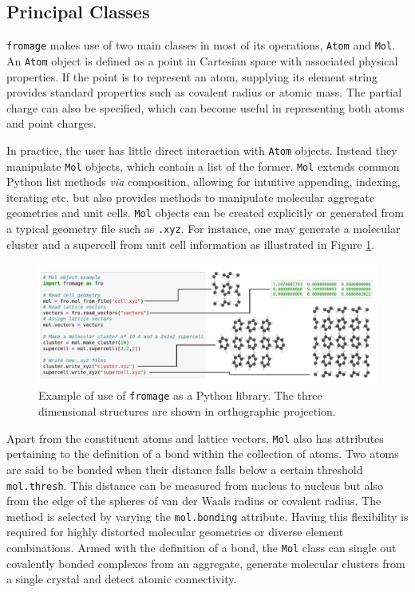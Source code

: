 \subsection{Principal Classes}
\texttt{fromage} makes use of two main classes in most of its operations, \texttt{Atom} and \texttt{Mol}. An \texttt{Atom} object is defined as a point in Cartesian space with associated physical properties. If the point is to represent an atom, supplying its element string provides standard properties such as covalent radius or atomic mass. The partial charge can also be specified, which can become useful in representing both atoms and point charges.

In practice, the user has little direct interaction with \texttt{Atom} objects. Instead they manipulate \texttt{Mol} objects, which contain a list of the former. \texttt{Mol} extends common Python list methods \textit{via} composition, allowing for intuitive appending, indexing, iterating etc. but also provides methods to manipulate molecular aggregate geometries and unit cells. \texttt{Mol} objects can be created explicitly or generated from a typical geometry file such as \texttt{.xyz}. For instance, one may generate a molecular cluster and a supercell from unit cell information as illustrated in Figure \ref{fig:script}.

\begin{figure}[ht]
\centering
  \includegraphics[width=\textwidth]{Chapters/6Implementation/script_fig.pdf}
  \caption{Example of use of \texttt{fromage} as a Python library. The three dimensional structures are shown in orthographic projection.}
  \label{fig:script}
\end{figure}


Apart from the constituent atoms and lattice vectors, \texttt{Mol} also has attributes pertaining to the definition of a bond within the collection of atoms. Two atoms are said to be bonded when their distance falls below a certain threshold \texttt{mol.thresh}. This distance can be measured from nucleus to nucleus but also from the edge of the spheres of van der Waals radius or covalent radius. The method is selected by varying the \texttt{mol.bonding} attribute. Having this flexibility is required for highly distorted molecular geometries or diverse element combinations. Armed with the definition of a bond, the \texttt{Mol} class can single out covalently bonded complexes from an aggregate, generate molecular clusters from a single crystal and detect atomic connectivity.

